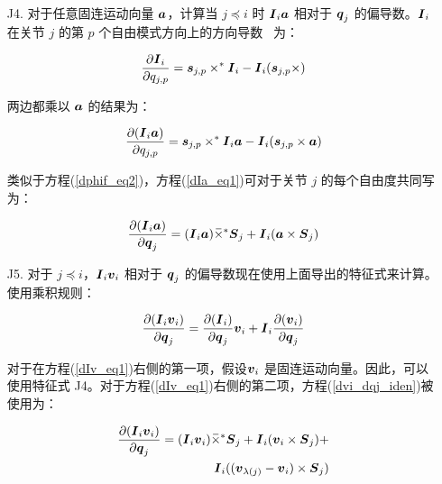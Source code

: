 \documentclass[letterpaper, 10 pt, conference]{ieeetran}  %
\begin{document}
{\begin{enumerate}
方程(\ref{dphif_eq2})可针对关节 $j$ 的每个自由度改写。因此，相对于 $\q_{j}$ 的偏导数为：

\begin{equation}
 \frac{\partial (\Phibar_{i}^{T} \f)}{\partial \q_{j}} = - \Phibar_{i}^{T} (\f \crff  \Phibar_{j}) 
 \label{dphif_eq3}
\end{equation}

\item[J4.] 对于任意固连运动向量 $\boldsymbol{a}$，计算当 $j \preceq i$ 时 $\boldsymbol{I}{}_{i} \boldsymbol{a}$ 相对于 $\q_{j}$ 的偏导数。$\boldsymbol{I}{}_{i}$ 在关节 $j$ 的第 $p$ 个自由模式方向上的方向导数~\cite{rbd} 为：

\begin{equation}
    \frac{\partial \I_{i}}{\partial q_{j,p}}=   \phibar_{j,p} \times^* \I_{i}- \I_{i}(\phibar_{j,p} \times)
    \label{I5_eqn}
\end{equation}

两边都乘以 $\boldsymbol{a}$ 的结果为：

\begin{equation}
    \frac{\partial (\I_{i} \a)}{\partial q_{j,p}} =  \phibar_{j,p} \times^* \I_{i} \a- \I_{i}(\phibar_{j,p} \times \a)   
    \label{dIa_eq1}
\end{equation}

类似于方程(\ref{dphif_eq2})，方程(\ref{dIa_eq1})可对于关节 $j$ 的每个自由度共同写为：

\begin{equation}
    \frac{\partial (\I_{i} \a)}{\partial \q_{j}} =  (\I_{i} \a) \crff \Phibar_{j} + \I_{i}(\a \times \Phibar_{j})   
    \label{dIa_eq2}
\end{equation}

\item[J5.] 对于 $j \preceq i$，$\boldsymbol{I}{}_{i} \boldsymbol{v}_{i}$ 相对于 $\q_{j}$ 的偏导数现在使用上面导出的特征式来计算。使用乘积规则：

\begin{equation}
    \frac{\partial (\I_{i} \v_{i})}{\partial \q_{j}} = \frac{\partial (\I_{i} )}{\partial \q_{j}} \v_{i} + \I_{i} \frac{\partial (\v_{i} )}{\partial \q_{j}}     
    \label{dIv_eq1}
\end{equation}

对于在方程(\ref{dIv_eq1})右侧的第一项，假设$\boldsymbol{v}_{i}$ 是固连运动向量。因此，可以使用特征式 J4。对于方程(\ref{dIv_eq1})右侧的第二项，方程(\ref{dvi_dqj_iden})被使用为：

\begin{equation}
    \begin{aligned}
    \frac{\partial (\I_{i} \v_{i})}{\partial \q_{j}} = (\I_{i} \v_{i}) \crff \Phibar_{j} + \I_{i}(\v_{i} \times \Phibar_{j})  +  \\
     \I_{i} ( (\v_{\lambda(j)} - \v_{i} )  \times \Phibar_{j})     
    \label{dIv_eq2}
    \end{aligned}
\end{equation}


\end{enumerate}}
\end{document}
